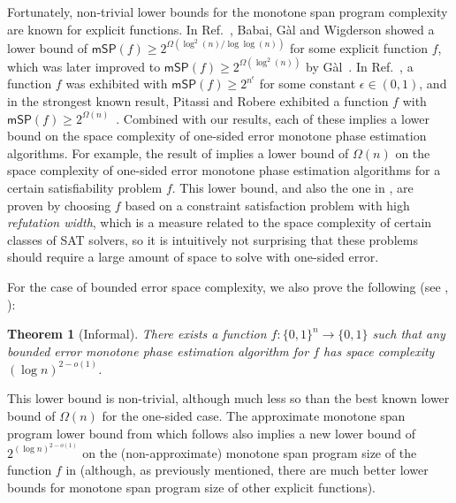 \documentclass[11pt]{article}
\numberwithin{equation}{section}
\newtheorem{theorem}{Theorem}[section]
\theoremstyle{definition}
\theoremstyle{plain}
\begin{document}
Fortunately, non-trivial lower bounds for the monotone span program complexity are known for explicit functions. In Ref.~\cite{BGW99}, Babai, G\`al and Wigderson showed a lower bound of $\mathsf{mSP}(f) \geq 2^{\Omega\left(\log^2(n)/\log\log(n)\right)}$ for some explicit function $f$, which was later improved to $\mathsf{mSP}(f)\geq 2^{\Omega(\log^2(n))}$ by G\`al~\cite{Gal01}. In Ref.~\cite{RPRC16}, a function $f$ was exhibited with $\mathsf{mSP}(f)\geq 2^{n^{\epsilon}}$ for some constant $\epsilon\in (0,1)$, and in the strongest known result, Pitassi and Robere exhibited a function $f$ with $\mathsf{mSP}(f)\geq 2^{\Omega(n)}$~\cite{PR17}. 
Combined with our results, each of these implies a lower bound on the space complexity of one-sided error monotone phase estimation algorithms. For example, the result of \cite{PR17} implies a lower bound of $\Omega(n)$ on the space complexity of one-sided error monotone phase estimation algorithms for a certain satisfiability problem $f$. This lower bound, and also the one in \cite{RPRC16}, are proven by choosing $f$ based on a constraint satisfaction problem with high \emph{refutation width}, which is a measure related to the space complexity of certain classes of SAT solvers, so it is intuitively not surprising that these problems should require a large amount of space to solve with one-sided error. 

For the case of bounded error space complexity, we also prove the following (see , ):
\begin{theorem}[Informal]\label{thm:explicit-informal}
There exists a function $f:\{0,1\}^n\rightarrow\{0,1\}$ such that any bounded error monotone phase estimation algorithm for $f$ has space complexity $(\log n)^{2-o(1)}$. 
\end{theorem}
This lower bound is non-trivial, although much less so than the best known lower bound of $\Omega(n)$ for the one-sided case.  
The approximate monotone span program lower bound from which  follows also implies a new lower bound of $2^{(\log n)^{2-o(1)}}$ on the (non-approximate) monotone span program size of the function $f$ in  (although, as previously mentioned, there are much better lower bounds for monotone span program size of other explicit functions).
\end{document}
